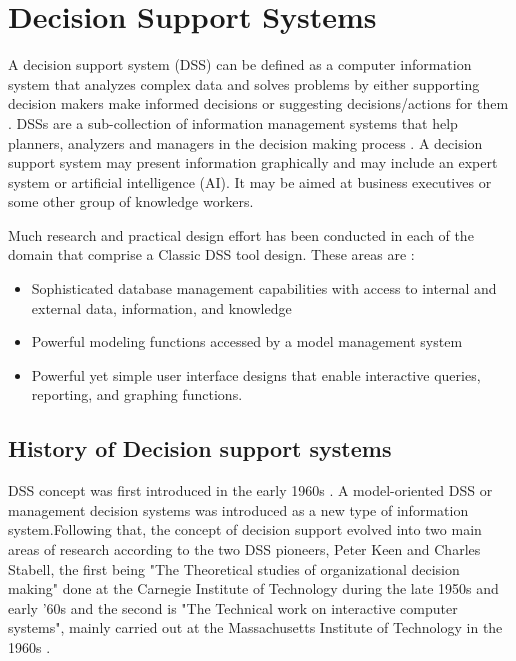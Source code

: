 \chapter{Decision Support Systems}
\renewcommand\textbullet{\ensuremath{\bullet}}
\label{ChapterTwo}
\indent A decision support system (DSS) can be defined as a computer information system that analyzes complex data and solves problems by either supporting decision makers make informed decisions or suggesting decisions/actions for them \cite{shim2002past}. DSSs are a sub-collection of information management systems that help planners, analyzers and managers in the decision making process \cite{khodashahri2013decision}. A decision support system may present information graphically and may include an expert system or artificial intelligence (AI). It may be aimed at business executives or some other group of knowledge workers.

\indent Much research and practical design effort has been conducted in each of the domain that comprise a Classic DSS tool design. These areas are \cite{shim2002past}:
\begin{itemize}
	\item Sophisticated database management capabilities with access to internal and external data, information, and knowledge
	\item Powerful modeling functions accessed by a model management system
	\item Powerful yet simple user interface designs that enable interactive queries, reporting, and graphing functions.
\end{itemize}
\section{History of Decision support systems}
\label{sec:HistoryOfDecisionSupportSystems}
\indent DSS concept was first introduced in the early 1960s \cite{power2007brief}. A model-oriented DSS or management decision systems was introduced as a new type of information system.Following that, the concept of decision support evolved into two main areas of research according to the two DSS pioneers, Peter Keen and Charles Stabell, the first being "The Theoretical studies of organizational decision making" done at the Carnegie Institute of Technology during the late 1950s and early '60s and the second is "The Technical work on interactive computer systems", mainly carried out at the Massachusetts Institute of Technology in the 1960s \cite{power2007brief,shim2002past}.

